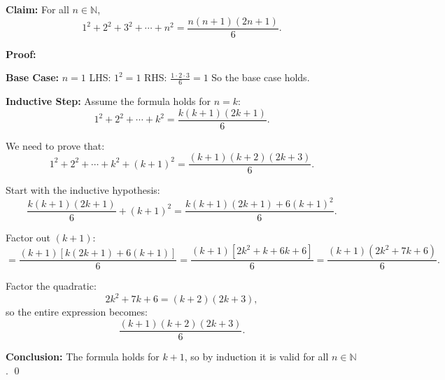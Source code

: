\documentclass{article}
\begin{document}
\textbf{Claim:} For all $n \in \mathbb{N}$,
\[
    1^2 + 2^2 + 3^2 + \cdots + n^2 = \frac{n(n+1)(2n+1)}{6}.
\]

\textbf{Proof:}

\textbf{Base Case:} $n = 1$
LHS: $1^2 = 1$
RHS: $\frac{1 \cdot 2 \cdot 3}{6} = 1$
So the base case holds.

\textbf{Inductive Step:}
Assume the formula holds for $n = k$:
\[
    1^2 + 2^2 + \cdots + k^2 = \frac{k(k+1)(2k+1)}{6}.
\]

We need to prove that:
\[
    1^2 + 2^2 + \cdots + k^2 + (k+1)^2 = \frac{(k+1)(k+2)(2k+3)}{6}.
\]

Start with the inductive hypothesis:
\[
    \frac{k(k+1)(2k+1)}{6} + (k+1)^2
    = \frac{k(k+1)(2k+1) + 6(k+1)^2}{6}.
\]

Factor out $(k+1)$:
\[
    = \frac{(k+1)\left[k(2k+1) + 6(k+1)\right]}{6}
    = \frac{(k+1)\left[2k^2 + k + 6k + 6\right]}{6}
    = \frac{(k+1)(2k^2 + 7k + 6)}{6}.
\]

Factor the quadratic:
\[
    2k^2 + 7k + 6 = (k+2)(2k+3),
\]
so the entire expression becomes:
\[
    \frac{(k+1)(k+2)(2k+3)}{6}.
\]

\textbf{Conclusion:} The formula holds for $k+1$, so by induction it is valid for all $n \in \mathbb{N}$.
\qed
\end{document}
